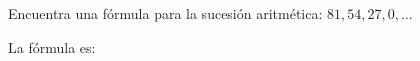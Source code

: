 \question[10] Encuentra una fórmula para la sucesión aritmética: $81,54,27,0,\dots$

La f\'ormula es: \fillin[$81-27(n-1) \text{ \'o } 108-27n$][5cm]
